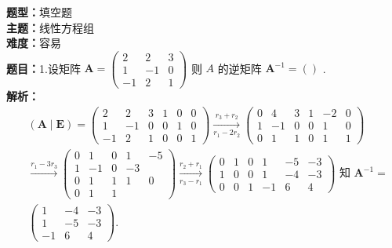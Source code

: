 \documentclass{ctexart}
\newenvironment{question}[5]{%
	\noindent\textbf{题型：}#1\\
	\textbf{主题：}#2\\
	\textbf{难度：}#3\\
	\textbf{题目：}#4\\
	\textbf{解析：}#5\\
	\vspace{1em}
}{}
\begin{document}
	
	\begin{question}
		{填空题}
		{线性方程组}
		{容易}
		{1.设矩阵 \(\mathbf{A}=\left(\begin{array}{ccc}2 & 2 & 3 \\ 1 & -1 & 0 \\ -1 & 2 & 1\end{array}\right)\) 则 \(A\) 的逆矩阵 \(\mathbf{A}^{-1}=()\) . }
		{\[
			\begin{aligned}
				& (\mathbf{A} \mid \mathbf{E})=\left(\begin{array}{ccc|ccc}
					2 & 2 & 3 & 1 & 0 & 0 \\
					1 & -1 & 0 & 0 & 1 & 0 \\
					-1 & 2 & 1 & 0 & 0 & 1
				\end{array}\right) \xrightarrow[r_1-2 r_2]{r_3+r_2}\left(\begin{array}{ccc|ccc}
					0 & 4 & 3 & 1 & -2 & 0 \\
					1 & -1 & 0 & 0 & 1 & 0 \\
					0 & 1 & 1 & 0 & 1 & 1
				\end{array}\right) \\
				& \xrightarrow{r_1-3 r_3}\left(\begin{array}{ccc|cc}
					0 & 1 & 0 & 1 & -5 \\
					1 & -1 & 0 & -3 \\
					0 & 1 & 1 & 1 & 0 \\
					0 & 1 & 1
				\end{array}\right) \xrightarrow[r_3-r_1]{r_2+r_1}\left(\begin{array}{lll|ccc}
					0 & 1 & 0 & 1 & -5 & -3 \\
					1 & 0 & 0 & 1 & -4 & -3 \\
					0 & 0 & 1 & -1 & 6 & 4
				\end{array}\right) \text { 知 } \mathbf{A}^{-1}= \\
				& \left(\begin{array}{ccc}
					1 & -4 & -3 \\
					1 & -5 & -3 \\
					-1 & 6 & 4
				\end{array}\right) .
			\end{aligned}
			\]} 
	\end{question}
	
\end{document}
